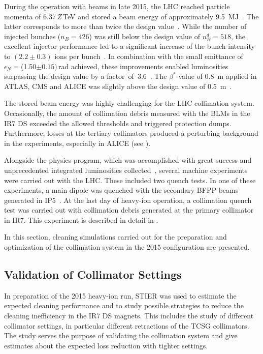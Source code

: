 During the operation with \lead beams in late 2015, the LHC reached particle momenta of 6.37$\,Z\,$TeV and stored a beam energy of approximately 9.5~MJ~\cite{IPAC16:TUPMW027}. The latter corresponds to more than twice the design value~\citedr. While the number of injected bunches \mbox{($n_B=426$)} was still below the design value of $n_B^{d} = 518$, the excellent injector performance led to a significant increase of the bunch intensity to $(2.2 \pm 0.3)$ ions per bunch~\cite{IPAC16:TUPMW027}. In combination with the small emittance of $\epsilon_N=$(1.50$\pm 0.15)$\mum\,rad achieved, these improvements enabled luminosities surpassing the design value by a \mbox{factor of 3.6}~\cite{IPAC16:TUPMW027}. The $\beta^*$-value of 0.8~m applied in ATLAS, CMS and ALICE was slightly above the design value of 0.5~m~\citedr.

The stored beam energy was highly challenging for the LHC collimation system. Occasionally, the amount of collimation debris measured with the BLMs in the IR7 DS exceeded the allowed thresholds and triggered protection dumps. Furthermore, losses at the tertiary collimators produced a perturbing background in the experiments, especially in ALICE (see ). 

\newpage
Alongside the physics program, which was accomplished with great success and unprecedented integrated luminosities collected~\cite{IPAC16:TUPMW027}, several machine experiments were carried out with the LHC. These included two quench tests. In one of these experiments, a main dipole was quenched with the secondary BFPP beams generated in IP5~\cite{accnote_bfpp_quench}. At the last day of heavy-ion operation, a collimation quench test was carried out with collimation debris generated at the primary collimator in IR7. This experiment is described in detail in .

In this section, cleaning simulations carried out for the preparation and optimization of the collimation system in the 2015 configuration are presented.

\subsection{Validation of Collimator Settings} \label{chap:STIER:validation}

In preparation of the 2015 heavy-ion run, STIER was used to estimate the expected cleaning performance and to study possible strategies to reduce the cleaning inefficiency in the IR7 DS magnets. This includes the study of different collimator settings, in particular different retractions of the TCSG collimators. The study serves the purpose of validating the collimation system and give estimates about the expected loss reduction with tighter settings. 

